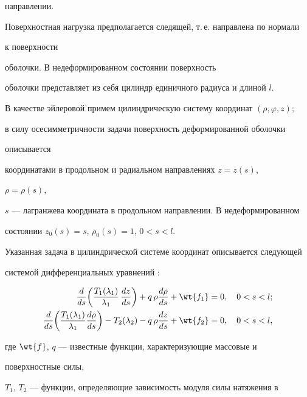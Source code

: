 направлении.


Поверхностная нагрузка предполагается следящей, т.\,е. направлена по нормали


к поверхности


оболочки. В недеформированном состоянии поверхность


оболочки представляет из себя цилиндр единичного радиуса и длиной $l$.


В качестве эйлеровой примем цилиндрическую систему координат $(\rho,


\varphi, z)$;


в силу осесимметричности задачи поверхность деформированной оболочки


описывается


координатами в продольном и радиальном направлениях $z=z(s)$,


$\rho =\rho(s)$,


$s$ --- лагранжева координата в продольном направлении. В недеформированном


состоянии $z_0(s)=s$, $\rho_0(s)=1$, $0 < s < l$.





Указанная задача в цилиндрической системе координат описывается следующей


системой дифференциальных уравнений \cite{bz_Iz05_R_Gul}:


\begin{align}


\label{shelBZB6}


\frac{d}{d s}


\bigg(\frac{T_{1}(\lambda_1)}{\lambda_1}\, \frac{d z}{ds} \bigg)


+ q \, \rho \frac{d \rho}{ds}+\wt{f_1} &= 0, \quad 0 < s < l;\\


%


\frac{d}{d s} \bigg(\frac{T_{1}(\lambda_1)}{\lambda_1}\frac{d \rho}{ds}


\bigg)- T_{2}(\lambda_2)-q \, \rho \frac{d z}{d s}+\wt{f_2} &= 0,


\quad 0 < s < l,


\label{shelBZB7}


\end{align}


где $\wt{f}$, $q$ --- известные функции, характеризующие массовые и


поверхностные силы,


$T_1$, $T_2$ --- функции, определяющие зависимость модуля силы натяжения в


